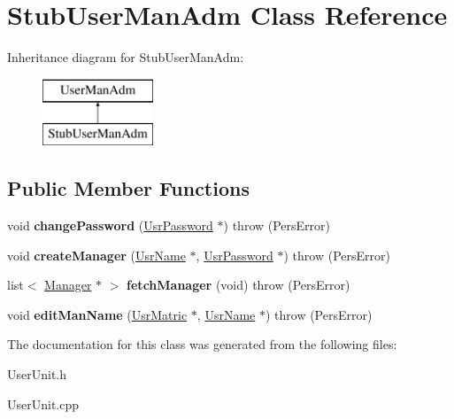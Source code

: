 \hypertarget{classStubUserManAdm}{\section{Stub\-User\-Man\-Adm Class Reference}
\label{dd/dfd/classStubUserManAdm}
}
Inheritance diagram for Stub\-User\-Man\-Adm\-:\begin{figure}[H]
\begin{center}
\leavevmode
\includegraphics[height=2.000000cm]{dd/dfd/classStubUserManAdm}
\end{center}
\end{figure}
\subsection*{Public Member Functions}
\begin{DoxyCompactItemize}
\item 
\hypertarget{classStubUserManAdm_a63130507e95ab092b0bf09704b13b6ec}{void {\bfseries change\-Password} (\hyperlink{classUsrPassword}{Usr\-Password} $\ast$)  throw (\-Pers\-Error)}\label{dd/dfd/classStubUserManAdm_a63130507e95ab092b0bf09704b13b6ec}

\item 
\hypertarget{classStubUserManAdm_ac833e3729b1adf46edf78376719acde5}{void {\bfseries create\-Manager} (\hyperlink{classUsrName}{Usr\-Name} $\ast$, \hyperlink{classUsrPassword}{Usr\-Password} $\ast$)  throw (\-Pers\-Error)}\label{dd/dfd/classStubUserManAdm_ac833e3729b1adf46edf78376719acde5}

\item 
\hypertarget{classStubUserManAdm_a1d8b9e3691aef8438bf0b125efb54972}{list$<$ \hyperlink{classManager}{Manager} $\ast$ $>$ {\bfseries fetch\-Manager} (void)  throw (\-Pers\-Error)}\label{dd/dfd/classStubUserManAdm_a1d8b9e3691aef8438bf0b125efb54972}

\item 
\hypertarget{classStubUserManAdm_ac1da713638e441434c8ec426be495a0b}{void {\bfseries edit\-Man\-Name} (\hyperlink{classUsrMatric}{Usr\-Matric} $\ast$, \hyperlink{classUsrName}{Usr\-Name} $\ast$)  throw (\-Pers\-Error)}\label{dd/dfd/classStubUserManAdm_ac1da713638e441434c8ec426be495a0b}

\end{DoxyCompactItemize}


The documentation for this class was generated from the following files\-:\begin{DoxyCompactItemize}
\item 
User\-Unit.\-h\item 
User\-Unit.\-cpp\end{DoxyCompactItemize}
